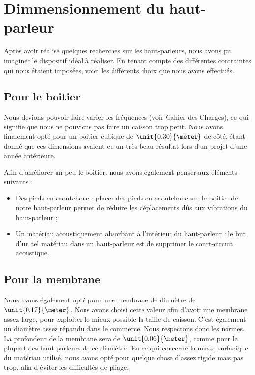 

\section{Dimmensionnement du haut-parleur}
Après avoir réalisé quelques recherches sur les haut-parleurs, nous avons pu imaginer le dispositif idéal à réaliser. En tenant compte des différentes contraintes qui nous étaient imposées, voici les différents choix que nous avons effectués.

\subsection{Pour le boitier}
Nous devions pouvoir faire varier les fréquences (voir Cahier des Charges), ce qui signifie que nous ne pouvions pas faire un caisson trop petit. Nous avons finalement opté pour un
boitier cubique de $\unit{0.30}{\meter}$ de côté, étant donné que ces dimensions avaient eu un très beau résultat lors d'un projet d'une année antérieure.

Afin d'améliorer un peu le boitier, nous avons également penser aux éléments suivants :

\begin{itemize}
	\item	Des pieds en caoutchouc : placer des pieds en caoutchouc sur le boitier de notre haut-parleur
				permet de réduire les déplacements dûs aux vibrations du haut-parleur ;
	\item	Un matériau acoustiquement absorbant à l'intérieur du haut-parleur : le but d'un tel matériau
				dans un haut-parleur est de supprimer le court-circuit acoustique.
\end{itemize}

\subsection{Pour la membrane}
Nous avons également opté pour une membrane de diamètre de $\unit{0.17}{\meter}$. Nous avons choisi cette valeur afin d'avoir une membrane assez large, pour exploiter le mieux possible la taille du caisson. C'est également un diamètre assez répandu dans le commerce. Nous respectons donc les normes.
La profondeur de la membrane sera de $\unit{0.06}{\meter}$, comme pour la plupart des haut-parleurs de ce diamètre. En ce qui concerne la masse surfacique du matériau utilisé, nous avons opté pour quelque chose d'assez rigide mais pas trop, afin d'éviter les difficultés de pliage.

